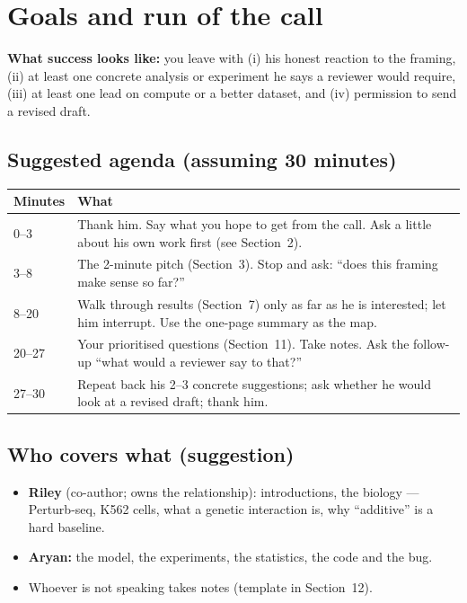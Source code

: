 \documentclass[10.5pt]{article}
\begin{document}
\section{Goals and run of the call}

\textbf{What success looks like:} you leave with (i) his honest reaction to the framing, (ii) at least one
concrete analysis or experiment he says a reviewer would require, (iii) at least one lead on compute or
a better dataset, and (iv) permission to send a revised draft.

\subsection*{Suggested agenda (assuming 30 minutes)}
\begin{tabular}{@{}p{2.2cm}p{13.3cm}@{}}
\toprule
Minutes & What\\
\midrule
0--3 & Thank him. Say what you hope to get from the call. Ask a little about his own work first
(see Section~2).\\
3--8 & The 2-minute pitch (Section~3). Stop and ask: ``does this framing make sense so far?''\\
8--20 & Walk through results (Section~7) only as far as he is interested; let him interrupt. Use the
one-page summary as the map.\\
20--27 & Your prioritised questions (Section~11). Take notes. Ask the follow-up ``what would a reviewer
say to that?''\\
27--30 & Repeat back his 2--3 concrete suggestions; ask whether he would look at a revised draft; thank him.\\
\bottomrule
\end{tabular}

\subsection*{Who covers what (suggestion)}
\begin{itemize}
\item \textbf{Riley} (co-author; owns the relationship): introductions, the biology --- Perturb-seq,
K562 cells, what a genetic interaction is, why ``additive'' is a hard baseline.
\item \textbf{Aryan:} the model, the experiments, the statistics, the code and the bug.
\item Whoever is not speaking takes notes (template in Section~12).
\end{itemize}
\end{document}

